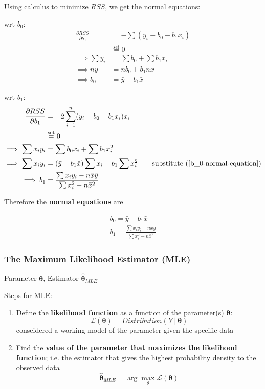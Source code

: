 \documentclass[11pt]{article}
\newcommand\VEC{\bm}{}
\theoremstyle{definition}
\numberwithin{equation}{section}
\begin{document}
Using calculus to minimize $RSS$, we get the normal equations:

wrt $b_0$:
\begin{align}
  \frac{\partial RSS}{\partial b_0} &= -\sum(y_i - b_0 - b_1x_i)\\
  &\stackrel{\text{set}}{=}0\\
  \implies \sum y_i &= \sum b_0 + \sum b_1x_i\\
  \implies n\bar{y} &= nb_0 + b_1n\bar{x}\\
  \implies b_0 &= \bar{y} - b_1\bar{x}\label{b_0-normal-equation}
\end{align}

wrt $b_1$:
\begin{align}
  \frac{\partial RSS}{\partial b_1} &= -2\sum^n_{i=1}(y_i - b_0 - b_1x_i)x_i\\
  &\stackrel{\text{set}}{=} 0\\
  \implies \sum x_iy_i &= \sum b_0x_i + \sum b_1x_i^2\\
  \implies \sum x_iy_i &= (\bar{y} - b_1\bar{x})\sum x_i + b_1\sum x_i^2\qquad\text{substitute (\ref{b_0-normal-equation})}\\
  \implies b_1 &= \frac{\sum x_iy_i - n\bar{x}\bar{y}}{\sum x_i^2 - n\bar{x}^2}
\end{align}

Therefore the \textbf{normal equations} are

\begin{gather}
  \boxed{b_0 = \bar{y} - b_1\bar{x}}\\
  \boxed{b_1 = \frac{\sum x_iy_i - n\bar{x}\bar{y}}{\sum x_i^2 - n\bar{x}^2}}
\end{gather}

\subsubsection{The Maximum Likelihood Estimator (MLE)}

Parameter $\VEC{\theta}$, Estimator $\hat{\VEC{\theta}}_{MLE}$

Steps for MLE:

\begin{enumerate}
  \item Define the \textbf{likelihood function} as a function of the parameter(s) $\VEC{\theta}$:
  \begin{equation}
    \mathcal{L}(\VEC{\theta}) = Distribution(Y\>|\>\VEC{\theta})
  \end{equation}
  conseidered a working model of the parameter given the specific data
  \item Find the \textbf{value of the parameter that maximizes the likelihood function}; i.e. the estimator that gives the highest probability density to the observed data
  \begin{equation}
    \hat{\VEC{\theta}}_{MLE} = \arg\max_{\theta}\mathcal{L}(\VEC{\theta})
  \end{equation}
\end{enumerate}
\end{document}
